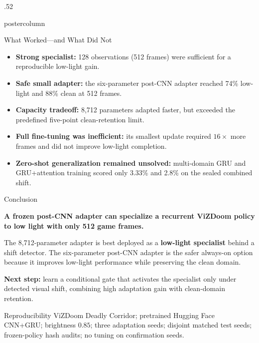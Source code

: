 \documentclass{beamer}
\begin{document}
\begin{frame}
\begin{columns}
\begin{column}{.52\textwidth}
\begin{beamercolorbox}[center]{postercolumn}
\begin{minipage}{.98\textwidth}
{      \begin{myblock}{What Worked---and What Did Not}
      \begin{itemize}
        \item \textbf{Strong specialist:} 128 observations (512 frames) were sufficient for a reproducible low-light gain.
        \item \textbf{Safe small adapter:} the six-parameter post-CNN adapter reached 74\% low-light and 88\% clean at 512 frames.
        \item \textbf{Capacity tradeoff:} 8,712 parameters adapted faster, but exceeded the predefined five-point clean-retention limit.
        \item \textbf{Full fine-tuning was inefficient:} its smallest update required $16\times$ more frames and did not improve low-light completion.
        \item \textbf{Zero-shot generalization remained unsolved:} multi-domain GRU and GRU+attention training scored only 3.33\% and 2.8\% on the sealed combined shift.
      \end{itemize}
      \end{myblock}\vfill

      \begin{myblock}{Conclusion}
      \begin{center}
      \Large\textbf{A frozen post-CNN adapter can specialize a recurrent ViZDoom policy to low light with only 512 game frames.}
      \end{center}
      The 8,712-parameter adapter is best deployed as a \textbf{low-light specialist} behind a shift detector. The six-parameter post-CNN adapter is the safer always-on option because it improves low-light performance while preserving the clean domain.

      \vspace{0.5cm}
      \textbf{Next step:} learn a conditional gate that activates the specialist only under detected visual shift, combining high adaptation gain with clean-domain retention.
      \end{myblock}\vfill

      \begin{myblock}{Reproducibility}
      ViZDoom Deadly Corridor; pretrained Hugging Face CNN+GRU; brightness $0.85$; three adaptation seeds; disjoint matched test seeds; frozen-policy hash audits; no tuning on confirmation seeds.
      \end{myblock}

      }\end{minipage}
    \end{beamercolorbox}
  \end{column}
\end{columns}
\end{frame}
\end{document}
